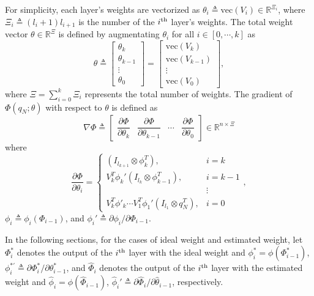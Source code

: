 \documentclass[lettersize,journal]{IEEEtran}
\begin{document}
For simplicity, each layer's weights are vectorized as $\theta_i\triangleq\text{vec}(V_i)\in\mathbb{R}^{\Xi_i}$, where $\Xi_i\triangleq (l_i+1)l_{i+1}$ is the number of the $i\textsuperscript{th}$ layer's weights. The total weight vector $\theta\in\mathbb{R}^{\Xi}$ is defined by augmentating $\theta_i$ for all $i\in \left[0,\cdots,k\right]$ as 
\begin{equation*}
    \theta \triangleq 
    \begin{bmatrix}
        \theta_k\\
        \theta_{k-1}\\
        \vdots\\
        \theta_0
    \end{bmatrix}
    =
    \begin{bmatrix}
        \text{vec}(V_k)\\
        \text{vec}(V_{k-1})\\
        \vdots\\
        \text{vec}(V_0)
    \end{bmatrix},
\end{equation*}
where $\Xi={\sum_{i=0}^{k} \Xi_i}$ represents the total number of weights. The gradient of $ \Phi(q_N;\theta)$ with respect to $\theta$ is defined as
\begin{equation}
    \nabla\Phi \triangleq
    \begin{bmatrix}
        \dfrac{\partial \Phi}{\partial \theta_k}&
        \dfrac{\partial \Phi}{\partial \theta_{k-1}}&
    \cdots &
        \dfrac{\partial \Phi}{\partial \theta_0}
    \end{bmatrix}
    \in\mathbb{R}^{n \times \Xi}
    \label{eq. nabla phi}
\end{equation}
where
\begin{equation*}
    \frac{\partial \Phi}{\partial \theta_i} = 
    \begin{cases}
        (I_{l_{k+1}}\otimes \phi_{k}^T  ), & i=k \\
        V_k^T   \phi_{k}' (I_{l_{k}}\otimes  \phi_{k-1}^T  ), & i=k-1\\
        &\vdots \\
        V_k^T   \phi'_{k} \cdots V_1^T  \phi_1' (I_{l_1}\otimes q_N^T  ), & i = 0
    \end{cases} ,
\end{equation*}
$\phi_i\triangleq \phi_i(\Phi_{i-1})$, and $\phi_i'\triangleq \partial \phi_i/\partial \Phi_{i-1}$.

In the following sections, for the cases of ideal weight and estimated weight, let $\Phi^*_i$ denotes the output of the $i\textsuperscript{th}$ layer with the ideal weight and $\phi^*_i=\phi(\Phi^*_{i-1})$, $\phi^{*'}_i\triangleq \partial \Phi^*_i/\partial \theta^*_{i-1}$, and $\hat\Phi_i$ denotes the output of the $i\textsuperscript{th}$ layer with the estimated weight and $\hat\phi_i=\phi(\hat\Phi_{i-1})$, $\hat\phi_i'\triangleq \partial \hat\Phi_i/\partial \hat\theta_{i-1}$, respectively.
\end{document}
